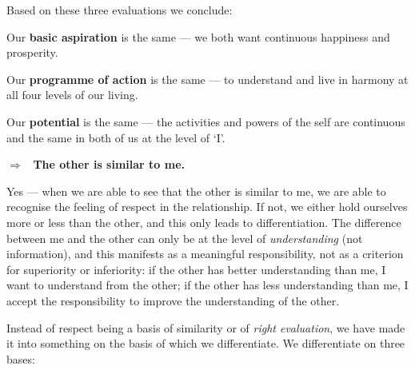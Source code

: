 Based on these three evaluations we conclude:

\begin{abul}
\item Our \textbf{basic aspiration} is the same --- we both want continuous
      happiness and prosperity.
\item Our \textbf{programme of action} is the same --- to understand and live
      in harmony at all four levels of our living.
\item Our \textbf{potential} is the same --- the activities and powers of the
      self are continuous and the same in both of us at the level of `I'.
\end{abul}

\begin{keybox}
$\Rightarrow$ \ \textbf{The other is similar to me.}
\end{keybox}

Yes --- when we are able to see that the other is similar to me, we are able
to recognise the feeling of respect in the relationship. If not, we either
hold ourselves more or less than the other, and this only leads to
differentiation. The difference between me and the other can only be at the
level of \emph{understanding} (not information), and this manifests as a
meaningful responsibility, not as a criterion for superiority or inferiority:
if the other has better understanding than me, I want to understand from the
other; if the other has less understanding than me, I accept the
responsibility to improve the understanding of the other.

%
  {}

\ans Instead of respect being a basis of similarity or of \emph{right
evaluation}, we have made it into something on the basis of which we
differentiate. We differentiate on three bases:


